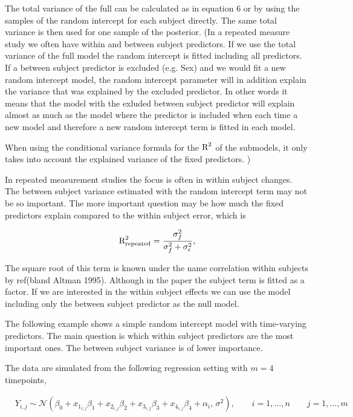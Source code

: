 \documentclass[11pt,a4paper,twoside]{book}\usepackage[]{graphicx}\usepackage[]{color}
\begin{document}
The total variance of the full can be calculated as in equation 6 or by using the samples of the random intercept for each subject directly. The same total variance is then used for one sample of the posterior. (In a repeated measure study we often have within and between subject predictors. If we use the total variance of the full model the random intercept is fitted including all predictors. If a between subject predictor is excluded (e.g. Sex) and we would fit a new random intercept model, the random intercept parameter will in addition explain the variance that was explained by the excluded predictor. In other words it means that the model with the exluded between subject predictor will explain almost as much as the model where the predictor is included when each time a new model and therefore a new random intercept term is fitted in each model. 

When using the conditional variance formula for the $\text{R}^2$ of the submodels, it only takes into account the explained variance of the fixed predictors. )


In repeated measurement studies the focus is often in within subject changes. The between subject variance estimated with the random intercept term may not be so important. The more important question may be how much the fixed predictors explain compared to the within subject error, which is

   \begin{align} 
\text{R}^2_{\text{repeated}} = \frac{\sigma_{f}^2}{\sigma_{f}^2  + \sigma_{\epsilon}^2},
\end{align}

The square root of this term is known under the name correlation within subjects by ref(bland Altman 1995). Although in the paper the subject term is fitted as a factor. If we are interested in the within subject effects we can use the model including only the between subject predictor as the null model.

The following example shows a simple random intercept model with time-varying predictors. The main question is which within subject predictors are the most important ones. The between subject variance is of lower importance. 

The data are simulated from the following regression setting with $m = 4$ timepoints,

\begin{align} 
&Y_{i,j} \sim \mathcal{N}(\beta_{0}+x_{1_{i,j}} \beta_{1}+x_{2_{i,j}} \beta_{2}+x_{3_{i,j}} \beta_{3}+x_{4_{i,j}} \beta_{4} + \alpha_{i}, \, \sigma^2), \qquad i = 1, \dots, n \qquad j = 1, \dots, m
\end{align} 
\end{document}
